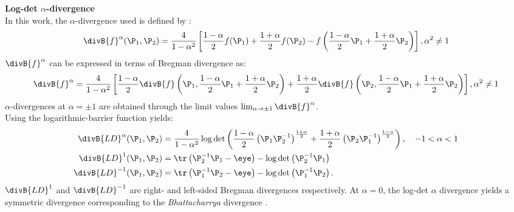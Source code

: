 \iflatexml\else {} \fi

\iflatexml\else {} \fi

\textbf{Log-det $\alpha$-divergence}\\
In this work, the $\alpha$-divergence used is defined by \cite{chebbi_means_2012}:
\begin{equation}
\divB{f}^\alpha(\P_1,\P_2) = \frac{4}{1-\alpha^2}\left[ \frac{1-\alpha}{2} f(\P_1) + \frac{1+\alpha}{2}f(\P_2) - f \left( \frac{1-\alpha}{2}\P_1 + \frac{1+\alpha}{2}\P_2 \right) \right], \alpha^2 \neq 1
\label{eq:div-alpha}
\end{equation}
$\divB{f}^\alpha$ can be expressed in terms of Bregman divergence as:
\begin{equation}
\divB{f}^\alpha = \frac{4}{1-\alpha^2}\left[\frac{1-\alpha}{2}\divB{f}\left(\P_1, \frac{1-\alpha}{2}\P_1+\frac{1+\alpha}{2}\P_2\right) + \frac{1+\alpha}{2}\divB{f}\left(\P_2, \frac{1-\alpha}{2}\P_1 + \frac{1+\alpha}{2} \P_2 \right)\right], \alpha^2 \neq 1
\label{eq:div-alpha2}
\end{equation}
$\alpha$-divergences at $\alpha = \pm 1$ are obtained through the limit values $\lim_{\alpha \rightarrow \pm 1}\divB{f}^\alpha$.\\
Using the logarithmic-barrier function yields:
\begin{equation}
\begin{split}
\divB{LD}^\alpha(\P_1,\P_2) &= \frac{4}{1-\alpha^2}\log \det \left(\frac{1-\alpha}{2}\left(\P_1 \P_2^{-1}\right)^{\frac{1+\alpha}{2}}+\frac{1+\alpha}{2}\left(\P_2 \P_1^{-1}\right)^{\frac{1-\alpha}{2}}\right), \quad -1 < \alpha < 1 \\
\divB{LD}^{1}(\P_1,\P_2) &= \tr \left( \P_2^{-1}\P_1-\eye \right) - \log \det \left(\P_2^{-1}\P_1 \right)\\
\divB{LD}^{-1}(\P_1,\P_2) &= \tr \left(\P_1^{-1}\P_2-\eye \right) - \log \det \left(\P_1^{-1}\P_2 \right) .
\end{split}
\label{eq:div-log-det-alpha}
\end{equation}   
$\divB{LD}^{1}$ and $\divB{LD}^{-1}$ are right- and left-sided Bregman divergences respectively.
At $\alpha=0$, the log-det $\alpha$ divergence yields a symmetric divergence corresponding to the \emph{Bhattacharrya} divergence \cite{chebbi_means_2012,sra_positive_2016}. 

